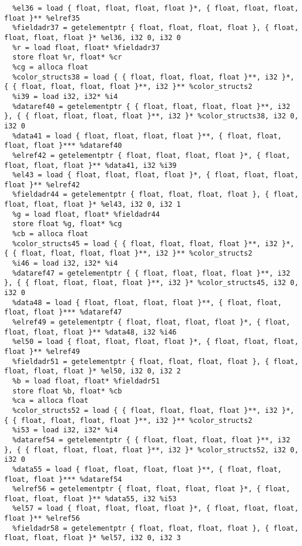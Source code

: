 \documentclass[main.tex]{subfiles}
\begin{document}
{\begin{lstlisting}
  %el36 = load { float, float, float, float }*, { float, float, float, float }** %elref35
  %fieldadr37 = getelementptr { float, float, float, float }, { float, float, float, float }* %el36, i32 0, i32 0
  %r = load float, float* %fieldadr37
  store float %r, float* %cr
  %cg = alloca float
  %color_structs38 = load { { float, float, float, float }**, i32 }*, { { float, float, float, float }**, i32 }** %color_structs2
  %i39 = load i32, i32* %i4
  %dataref40 = getelementptr { { float, float, float, float }**, i32 }, { { float, float, float, float }**, i32 }* %color_structs38, i32 0, i32 0
  %data41 = load { float, float, float, float }**, { float, float, float, float }*** %dataref40
  %elref42 = getelementptr { float, float, float, float }*, { float, float, float, float }** %data41, i32 %i39
  %el43 = load { float, float, float, float }*, { float, float, float, float }** %elref42
  %fieldadr44 = getelementptr { float, float, float, float }, { float, float, float, float }* %el43, i32 0, i32 1
  %g = load float, float* %fieldadr44
  store float %g, float* %cg
  %cb = alloca float
  %color_structs45 = load { { float, float, float, float }**, i32 }*, { { float, float, float, float }**, i32 }** %color_structs2
  %i46 = load i32, i32* %i4
  %dataref47 = getelementptr { { float, float, float, float }**, i32 }, { { float, float, float, float }**, i32 }* %color_structs45, i32 0, i32 0
  %data48 = load { float, float, float, float }**, { float, float, float, float }*** %dataref47
  %elref49 = getelementptr { float, float, float, float }*, { float, float, float, float }** %data48, i32 %i46
  %el50 = load { float, float, float, float }*, { float, float, float, float }** %elref49
  %fieldadr51 = getelementptr { float, float, float, float }, { float, float, float, float }* %el50, i32 0, i32 2
  %b = load float, float* %fieldadr51
  store float %b, float* %cb
  %ca = alloca float
  %color_structs52 = load { { float, float, float, float }**, i32 }*, { { float, float, float, float }**, i32 }** %color_structs2
  %i53 = load i32, i32* %i4
  %dataref54 = getelementptr { { float, float, float, float }**, i32 }, { { float, float, float, float }**, i32 }* %color_structs52, i32 0, i32 0
  %data55 = load { float, float, float, float }**, { float, float, float, float }*** %dataref54
  %elref56 = getelementptr { float, float, float, float }*, { float, float, float, float }** %data55, i32 %i53
  %el57 = load { float, float, float, float }*, { float, float, float, float }** %elref56
  %fieldadr58 = getelementptr { float, float, float, float }, { float, float, float, float }* %el57, i32 0, i32 3

\end{lstlisting}}
\end{document}
